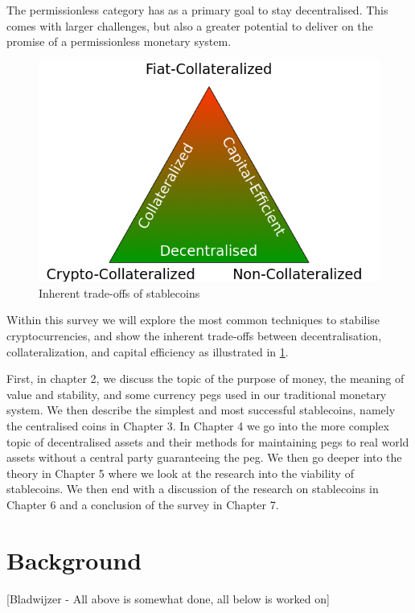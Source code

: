 \documentclass[english,]{IEEEtran}
\begin{document}
The permissionless category has as a primary goal to stay decentralised.
This comes with larger challenges, but also a greater potential to
deliver on the promise of a permissionless monetary system.

\begin{figure}[htbp]
\centering
\includegraphics{img/Triangle.png}
\caption{Inherent trade-offs of stablecoins \label{triangle_label}}
\end{figure}

Within this survey we will explore the most common techniques to
stabilise cryptocurrencies, and show the inherent trade-offs between
decentralisation, collateralization, and capital efficiency as
illustrated in \ref{triangle_label}.

First, in chapter 2, we discuss the topic of the purpose of money, the
meaning of value and stability, and some currency pegs used in our
traditional monetary system. We then describe the simplest and most
successful stablecoins, namely the centralised coins in Chapter 3. In
Chapter 4 we go into the more complex topic of decentralised assets and
their methods for maintaining pegs to real world assets without a
central party guaranteeing the peg. We then go deeper into the theory in
Chapter 5 where we look at the research into the viability of
stablecoins. We then end with a discussion of the research on
stablecoins in Chapter 6 and a conclusion of the survey in Chapter 7.

\section{Background}\label{background}

{[}Bladwijzer - All above is somewhat done, all below is worked on{]}
\end{document}
